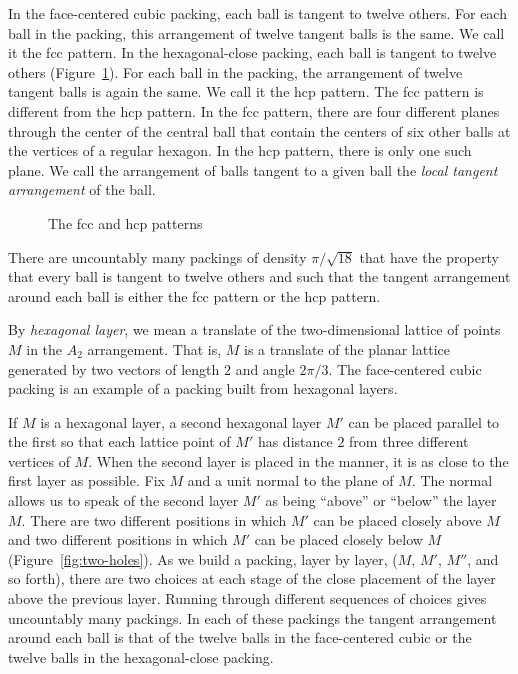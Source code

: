 In the face-centered cubic packing, each ball is tangent to twelve
others.  For each ball in the packing, this arrangement of twelve
tangent balls is the same.  We call it the fcc pattern. 
In the
hexagonal-close packing, each ball is tangent to twelve others
(Figure~\ref{fig:hcp}).
For each ball in the packing, the arrangement of twelve tangent
balls is again the same.  We call it the hcp pattern.  The fcc
pattern is different from the hcp pattern.  In the fcc pattern,
there are four different planes through the center of the central
ball that contain the centers of six other balls at the vertices
of a regular hexagon.  In the hcp pattern, there is only one such
plane.  We call the arrangement of balls tangent to a given ball
the {\it local tangent arrangement} of the ball.

\begin{figure}[htb]
  \centering
  \caption{The fcc and hcp patterns}
  \label{fig:hcp}
\end{figure}

There are uncountably many packings of density $\pi/\sqrt{18}$
that have the property that every ball is tangent to twelve others
and such that the tangent arrangement around each ball is either
the fcc pattern or the hcp pattern.

By {\it hexagonal layer}, we mean a translate of the two-dimensional
lattice of points $M$ in the $A_2$ arrangement. That is, $M$ is a
translate of the planar lattice generated by two vectors of length
$2$ and angle $2\pi/3$.  The face-centered cubic packing is an
example of a packing built from hexagonal layers.

If $M$ is a hexagonal layer, a second hexagonal layer $M'$ can be
placed parallel to the first so that each lattice point of $M'$ has
distance $2$ from three different vertices of $M$.  When the second
layer is placed in the manner, it is as close to the first layer as
possible. Fix $M$ and a unit normal to the plane of $M$. The normal
allows us to speak of the second layer $M'$ as being ``above'' or
``below'' the layer $M$. There are two different positions in which
$M'$ can be placed closely above $M$ and two different positions in
which $M'$ can be placed closely below $M$  (Figure~\ref{fig:two-holes}). As we build a packing,
layer by layer, ($M$, $M'$, $M''$, and so forth), there are two
choices at each stage of the close placement of the layer above the
previous layer. Running through different sequences of choices gives
uncountably many packings.  In each of these packings the tangent
arrangement around each ball is that of the twelve balls in the
face-centered cubic or the twelve balls in the hexagonal-close
packing.

